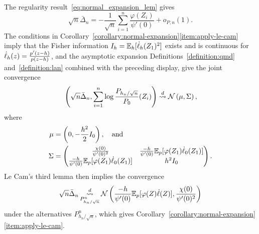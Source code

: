 


The regularity result~\eqref{eq:normal_expansion_lem} gives
\begin{equation*}
  \sqrt{n} \bar{\Delta}_n = -\frac{1}{\sqrt{n}}
  \sum_{i = 1}^n  \frac{\varphi(Z_i)}{\psi'(0)} + o_{P,n}(1).
\end{equation*}
The conditions in
Corollary~\ref{corollary:normal-expansion}\eqref{item:apply-le-cam} imply
that the Fisher information $I_h =
\mathbb{E}_h[\dot{\ell}_h(Z_1)^2]$ exists and is continuous for
$\dot{\ell}_h(z) = \frac{p'(z - h)}{p(z - h)}$,
and the asymptotic expansion Definitions~\ref{definition:qmd}
and~\ref{definition:lan} combined
with the preceding display, give the joint convergence
\begin{align*}
  & \left(\sqrt{n} \bar{\Delta}_n, \sum_{i=1}^n \log \frac{P_{h_n/\sqrt{n}}}{P_0}(Z_i)
  \right) \stackrel{d}{\rightsquigarrow} \mathcal{N} \left(\mu, \Sigma \right), \\
\end{align*}  
where
\begin{align*}
  \mu & = \left(0,-\frac{h^2}{2} I_0 \right), ~~~\mbox{and} \\
  \Sigma & = \begin{pmatrix}
    \frac{\chi(0)}{\psi'(0)^2} & \frac{-h}{ \psi'(0)}
    \mathbb{E}_p[\varphi(Z_1) \dot{\ell}_0(Z_1)] \\
    \frac{-h}{ \psi'(0)} \mathbb{E}_p[\varphi(Z_1) \dot{\ell}_0(Z_1)]
    & h^2 I_0
  \end{pmatrix}.
\end{align*}
Le Cam's third lemma \cite[Exm. 6.7]{VanDerVaart98} then implies the
convergence
\begin{equation*}
  \sqrt{n}\bar{\Delta}_n
  \mathop{\stackrel{d}{\rightsquigarrow}}_{P_{h_n/\sqrt{n}}^n}
  \mathcal{N}\left(\frac{-h}{ \psi'(0)} \mathbb{E}_p[\varphi(Z) \dot{\ell}(Z)],
  \frac{\chi(0)}{\psi'(0)^2} \right)
\end{equation*}
under the alternatives $P^n_{h_n/\sqrt{n}}$, which gives
Corollary~\ref{corollary:normal-expansion}\eqref{item:apply-le-cam}.

